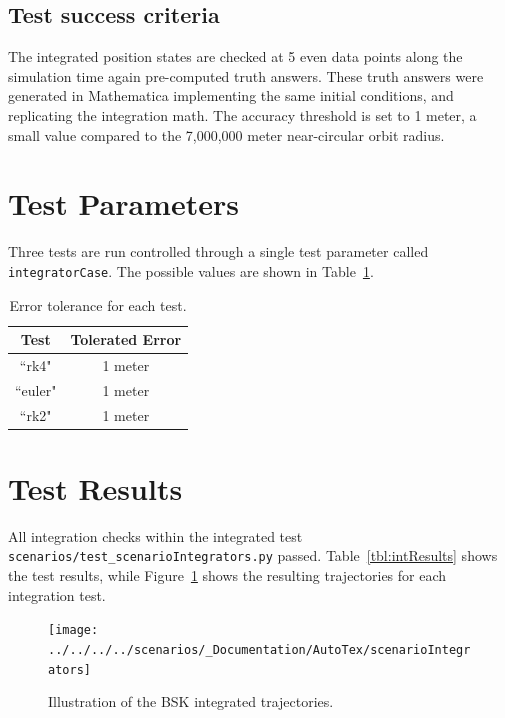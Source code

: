 \subsection{Test success criteria}
The integrated position states are checked at 5 even data points along the simulation time again pre-computed truth answers.  These truth answers were generated in Mathematica implementing the same initial conditions, and replicating the integration math.    The accuracy threshold is set to 1 meter, a small value compared to the 7,000,000 meter near-circular orbit radius.  



\section{Test Parameters}
Three tests are run controlled through a single test parameter called {\tt integratorCase}.  The possible values are shown in Table~\ref{tbl:intCases}.  

\begin{table}[htbp]
	\caption{Error tolerance for each test.}
	\label{tbl:intCases}
	\centering \fontsize{10}{10}\selectfont
	\begin{tabular}{ c | c } %
		\hline\hline
		\textbf{Test}   	      	               & \textbf{Tolerated Error} 						           \\ \hline
		``rk4"                           & 1 meter	  \\ 
		``euler"                           & 1 meter	  \\ 
		``rk2"                           & 1 meter	  \\ 
		\hline\hline
	\end{tabular}
\end{table}

\section{Test Results}
All integration checks within the integrated test {\tt scenarios/test\_scenarioIntegrators.py} passed.  Table~\ref{tbl:intResults} shows the test results, while Figure~\ref{fig:intResultsPython} shows the resulting trajectories for each integration test.

\begin{figure}[t]
	\centerline{
		\texttt{[image: ../../../../scenarios/\_Documentation/AutoTex/scenarioIntegrators]}
	}
	\caption{Illustration of the BSK integrated trajectories.}
	\label{fig:intResultsPython}
\end{figure}

